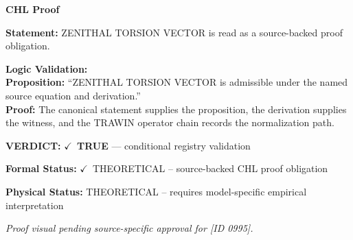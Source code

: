 \vspace{0.45em}
\noindent\textbf{CHL Proof}\par
\textbf{Statement:} ZENITHAL TORSION VECTOR is read as a source-backed proof obligation.

\textbf{Logic Validation:}\\
\textbf{Proposition:} ``ZENITHAL TORSION VECTOR is admissible under the named source equation and derivation.''\\
\textbf{Proof:} The canonical statement supplies the proposition, the derivation supplies the witness, and the TRAWIN operator chain records the normalization path.

\textbf{VERDICT:} \ensuremath{\checkmark}\ \textbf{TRUE} --- conditional registry validation

\textbf{Formal Status:} \ensuremath{\checkmark}\ THEORETICAL -- source-backed CHL proof obligation

\textbf{Physical Status:} THEORETICAL -- requires model-specific empirical interpretation
\par\vspace{0.45em}
\par
\vfill
\begingroup\footnotesize\itshape
Proof visual pending source-specific approval for [ID 0995].
\par\endgroup
\vfill
\endgroup
\endgroup

